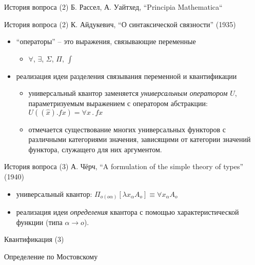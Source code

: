 \documentclass{beamer}
\begin{document}
\begin{frame}{История вопроса (2)}
Б. Рассел, А. Уайтхед, ``Principia Mathematica``\\
\bigskip

\end{frame}

\begin{frame}{История вопроса (2)}
К. Айдукевич, ``О синтаксической связности'' (1935)
\bigskip
\begin{itemize}
	\item ``операторы'' -- это выражения, связывающие переменные 
	\medskip
	    \begin{itemize}
	        \item $\forall$, $\exists$, $\Sigma$, $\Pi$, $\int$
	    \end{itemize}
    \medskip
	\item реализация идеи разделения связывания переменной и квантификации
	    \medskip
	    \begin{itemize}
	        \item универсальный квантор заменяется \textit{универсальным оператором} $U$, параметризуемым выражением с оператором абстракции: $U((\hat{x}).fx) = \forall x \, . \, fx$
	        \medskip
	        \item отмечается существование многих универсальных функторов с различными категориями значения, зависящими от категории значений функтора, служащего для них аргументом.
	    \end{itemize}
\end{itemize}
\end{frame}

\begin{frame}{История вопроса (3)}
А. Чёрч, ``A formulation of the simple theory of types'' (1940)
\bigskip
\begin{itemize}
    \item универсальный квантор: $\Pi_{o(o\alpha)}[\lambda x_\alpha A_o] \equiv \forall x_\alpha A_o$
    \medskip
    \item реализация идеи \textit{определения} квантора с помощью характеристической функции (типа $\alpha \to o$).
\end{itemize}
\end{frame}


\begin{frame}{Квантификация (3)}

\end{frame}

\begin{frame}{}
\begin{center}
Определение по Мостовскому
\end{center}
\end{frame}
\end{document}
